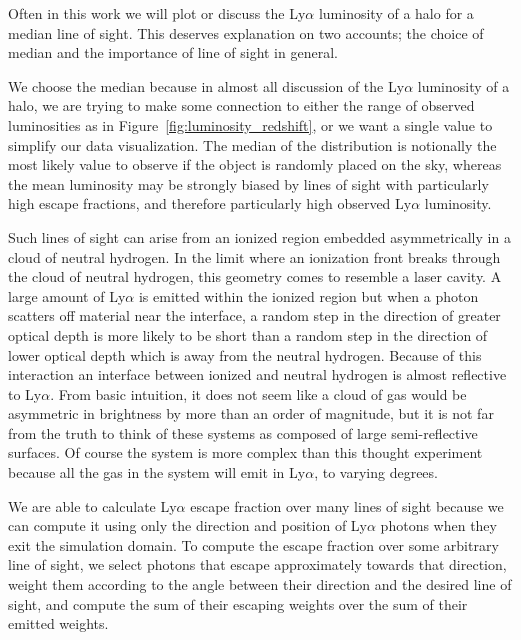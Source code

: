 Often in this work we will plot or discuss the Ly$\alpha$ luminosity of a halo for a median line of sight.
This deserves explanation on two accounts; the choice of median and the importance of line of sight in general.

We choose the median because in almost all discussion of the Ly$\alpha$ luminosity of a halo, we are trying to make some connection to either the range of observed luminosities as in Figure~\ref{fig:luminosity_redshift}, or we want a single value to simplify our data visualization.
The median of the distribution is notionally the most likely value to observe if the object is randomly placed on the sky, whereas the mean luminosity may be strongly biased by lines of sight with particularly high escape fractions, and therefore particularly high observed Ly$\alpha$ luminosity.

Such lines of sight can arise from an ionized region embedded asymmetrically in a cloud of neutral hydrogen.
In the limit where an ionization front breaks through the cloud of neutral hydrogen, this geometry comes to resemble a laser cavity.
A large amount of Ly$\alpha$ is emitted within the ionized region but when a photon scatters off material near the interface, a random step in the direction of greater optical depth is more likely to be short than a random step in the direction of lower optical depth which is away from the neutral hydrogen.
Because of this interaction an interface between ionized and neutral hydrogen is almost reflective to Ly$\alpha$.
From basic intuition, it does not seem like a cloud of gas would be asymmetric in brightness by more than an order of magnitude, but it is not far from the truth to think of these systems as composed of large semi-reflective surfaces.
Of course the system is more complex than this thought experiment because all the gas in the system will emit in Ly$\alpha$, to varying degrees.

We are able to calculate Ly$\alpha$ escape fraction over many lines of sight because we can compute it using only the direction and position of Ly$\alpha$ photons when they exit the simulation domain.
To compute the escape fraction over some arbitrary line of sight, we select photons that escape approximately towards that direction, weight them according to the angle between their direction and the desired line of sight, and compute the sum of their escaping weights over the sum of their emitted weights.

